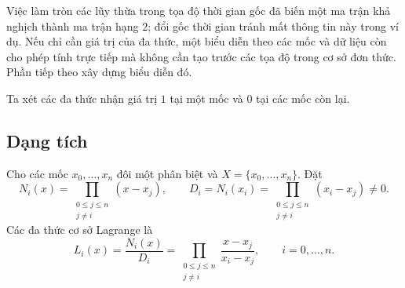 \documentclass[12pt,a4paper,oneside]{book}
\numberwithin{algorithm}{chapter}
\theoremstyle{definition}
\begin{document}
Việc làm tròn các lũy thừa trong tọa độ thời gian gốc đã biến một ma trận khả nghịch thành ma trận hạng $2$; đổi gốc thời gian tránh mất thông tin này trong ví dụ. Nếu chỉ cần giá trị của đa thức, một biểu diễn theo các mốc và dữ liệu còn cho phép tính trực tiếp mà không cần tạo trước các tọa độ trong cơ sở đơn thức. Phần tiếp theo xây dựng biểu diễn đó.

Ta xét các đa thức nhận giá trị $1$ tại một mốc và $0$ tại các mốc còn lại.

\subsection{Dạng tích}
Cho các mốc $x_0,\ldots,x_n$ đôi một phân biệt và $X=\{x_0,\ldots,x_n\}$. Đặt
\[
 N_i(x)=\prod_{\substack{0\leq j\leq n\\j\ne i}}(x-x_j),
 \qquad
 D_i=N_i(x_i)=\prod_{\substack{0\leq j\leq n\\j\ne i}}(x_i-x_j)\ne0.
\]
Các đa thức cơ sở Lagrange là
\begin{equation}\label{eq:lagrange-basis}
 L_i(x)=\frac{N_i(x)}{D_i}
 =\prod_{\substack{0\leq j\leq n\\j\ne i}}
   \frac{x-x_j}{x_i-x_j},\qquad i=0,\ldots,n.
\end{equation}
\end{document}
